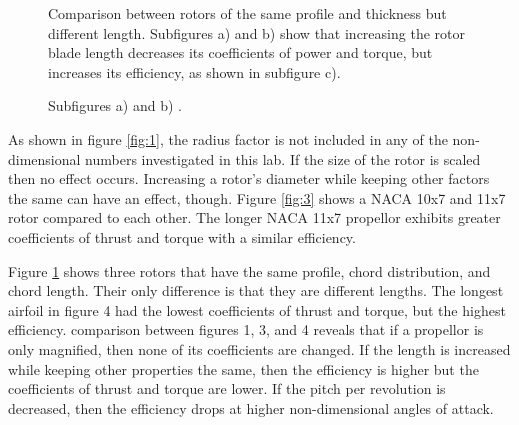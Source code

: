 \documentclass{article}
\begin{document}
\begin{figure}
  \centering
  \caption{Comparison between rotors of the same profile and thickness but different length. Subfigures a) and b) show that increasing the rotor blade length decreases its coefficients of power and torque, but increases its efficiency, as shown in subfigure c).}
  \captionsetup{aboveskip=0pt,font=it}
  \caption*{Subfigures a) and b) .}
  \label{fig:4}
\end{figure}

As shown in figure \ref{fig:1}, the radius factor is not included in any of the non-dimensional numbers investigated in this lab. If the size of the rotor is scaled then no effect occurs. Increasing a rotor's diameter while keeping other factors the same can have an effect, though. Figure \ref{fig:3} shows a NACA 10x7 and 11x7 rotor compared to each other. The longer NACA 11x7 propellor exhibits greater coefficients of thrust and torque with a similar efficiency. \newline

Figure \ref{fig:4} shows three rotors that have the same profile, chord distribution, and chord length. Their only difference is that they are different lengths. The longest airfoil in figure 4 had the lowest coefficients of thrust and torque, but the highest efficiency. comparison between figures 1, 3, and 4 reveals that if a propellor is only magnified, then none of its coefficients are changed. If the length is increased while keeping other properties the same, then the efficiency is higher but the coefficients of thrust and torque are lower. If the pitch per revolution is decreased, then the efficiency drops at higher non-dimensional angles of attack. 
\end{document}
